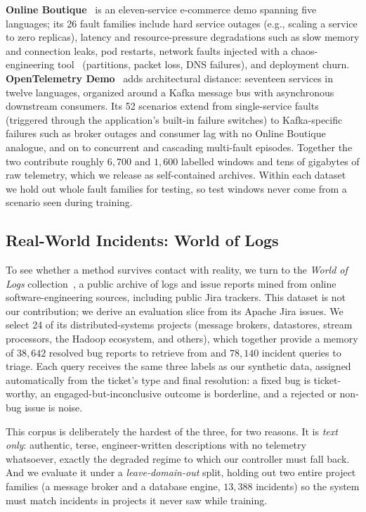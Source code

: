 \textbf{Online Boutique}~\cite{googleboutique} is an eleven-service e-commerce demo
spanning five languages; its 26 fault families include hard service outages (e.g., scaling a service to zero replicas), latency and resource-pressure
degradations such as slow memory and connection leaks, pod restarts, network
faults injected with a chaos-engineering tool~\cite{chaosmesh} (partitions, packet
loss, DNS failures), and deployment churn. \textbf{OpenTelemetry
Demo}~\cite{oteldemo} adds architectural distance:
seventeen services in twelve languages, organized around a Kafka message bus with
asynchronous downstream consumers. Its 52 scenarios extend from single-service faults (triggered through the application's built-in failure switches) to Kafka-specific failures such as broker outages and consumer lag with no Online Boutique analogue, and on to concurrent and cascading multi-fault episodes. Together the two contribute roughly $6{,}700$ and $1{,}600$ labelled
windows and tens of gigabytes of raw telemetry, which we release as self-contained
archives. Within each dataset we hold out whole fault families for testing, so test
windows never come from a scenario seen during training.

\subsection{Real-World Incidents: World of Logs}
\label{sec:datasets-wol}

To see whether a method survives contact with reality, we turn to the \emph{World
of Logs} collection~\cite{wang2026worldoflogs}, a public archive of logs and issue reports
mined from online software-engineering sources, including public Jira trackers.
This dataset is not our contribution; we derive an evaluation slice from its Apache Jira issues. We select 24 of its
distributed-systems projects (message brokers, datastores, stream processors,
the Hadoop ecosystem, and others), which together provide a memory of $38{,}642$
resolved bug reports to retrieve from and $78{,}140$ incident queries to triage.
Each query receives the same three labels as our synthetic data, assigned
automatically from the ticket's type and final resolution: a fixed bug is
ticket-worthy, an engaged-but-inconclusive outcome is borderline, and a rejected
or non-bug issue is noise.

This corpus is deliberately the hardest of the three, for two reasons. It is
\emph{text only}: authentic, terse, engineer-written descriptions with no
telemetry whatsoever, exactly the degraded regime to which our controller must
fall back. And we evaluate it under a \emph{leave-domain-out} split, holding out
two entire project families (a message broker and a database engine, $13{,}388$
incidents) so the system must match incidents in projects it never saw while training. 

